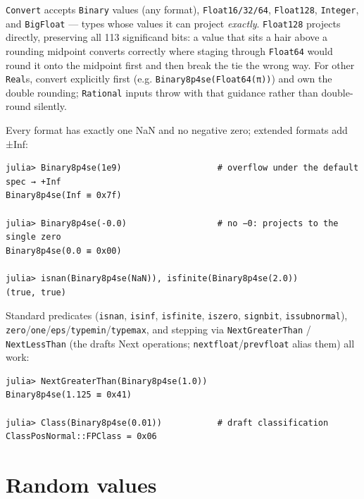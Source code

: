 \texttt{Convert} accepts \texttt{Binary} values (any format), \texttt{Float16/32/64}, \texttt{Float128}, \texttt{Integer}, and \texttt{BigFloat} — types whose values it can project \emph{exactly}. \texttt{Float128} projects directly, preserving all 113 significand bits: a value that sits a hair above a rounding midpoint converts correctly where staging through \texttt{Float64} would round it onto the midpoint first and then break the tie the wrong way. For other \texttt{Real}s, convert explicitly first (e.g. \texttt{Binary8p4se(Float64(π))}) and own the double rounding; \texttt{Rational} inputs throw with that guidance rather than double-round silently.



Every format has exactly one NaN and no negative zero; extended formats add ±Inf:




\begin{verbatim}
julia> Binary8p4se(1e9)                   # overflow under the default spec → +Inf
Binary8p4se(Inf ≡ 0x7f)

julia> Binary8p4se(-0.0)                  # no −0: projects to the single zero
Binary8p4se(0.0 ≡ 0x00)

julia> isnan(Binary8p4se(NaN)), isfinite(Binary8p4se(2.0))
(true, true)
\end{verbatim}



Standard predicates (\texttt{isnan}, \texttt{isinf}, \texttt{isfinite}, \texttt{iszero}, \texttt{signbit}, \texttt{issubnormal}), \texttt{zero}/\texttt{one}/\texttt{eps}/\texttt{typemin}/\texttt{typemax}, and stepping via \texttt{NextGreaterThan} / \texttt{NextLessThan} (the draft{\textquotesingle}s Next operations; \texttt{nextfloat}/\texttt{prevfloat} alias them) all work:




\begin{verbatim}
julia> NextGreaterThan(Binary8p4se(1.0))
Binary8p4se(1.125 ≡ 0x41)

julia> Class(Binary8p4se(0.01))           # draft classification
ClassPosNormal::FPClass = 0x06
\end{verbatim}



\section{Random values}



